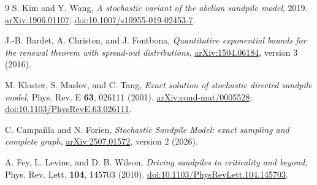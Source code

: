 \documentclass[11pt]{article}
\numberwithin{equation}{section}
\theoremstyle{definition}
\begin{document}
\begin{thebibliography}{9}
S. Kim and Y. Wang, \emph{A stochastic variant of the abelian sandpile model}, 2019.
\href{https://arxiv.org/abs/1906.01107}{arXiv:1906.01107};
\href{https://doi.org/10.1007/s10955-019-02453-7}{doi:10.1007/s10955-019-02453-7}.

J.-B. Bardet, A. Christen, and J. Fontbona,
\emph{Quantitative exponential bounds for the renewal theorem with spread-out distributions},
\href{https://arxiv.org/abs/1504.06184}{arXiv:1504.06184}, version 3 (2016).

M. Kloster, S. Maslov, and C. Tang,
\emph{Exact solution of stochastic directed sandpile model},
Phys. Rev. E \textbf{63}, 026111 (2001).
\href{https://arxiv.org/abs/cond-mat/0005528}{arXiv:cond-mat/0005528};
\href{https://doi.org/10.1103/PhysRevE.63.026111}{doi:10.1103/PhysRevE.63.026111}.

C. Campailla and N. Forien,
\emph{Stochastic Sandpile Model: exact sampling and complete graph},
\href{https://arxiv.org/abs/2507.01572}{arXiv:2507.01572}, version 2 (2026).

A. Fey, L. Levine, and D. B. Wilson,
\emph{Driving sandpiles to criticality and beyond},
Phys. Rev. Lett. \textbf{104}, 145703 (2010).
\href{https://doi.org/10.1103/PhysRevLett.104.145703}{doi:10.1103/PhysRevLett.104.145703}.
\end{thebibliography}
\end{document}
